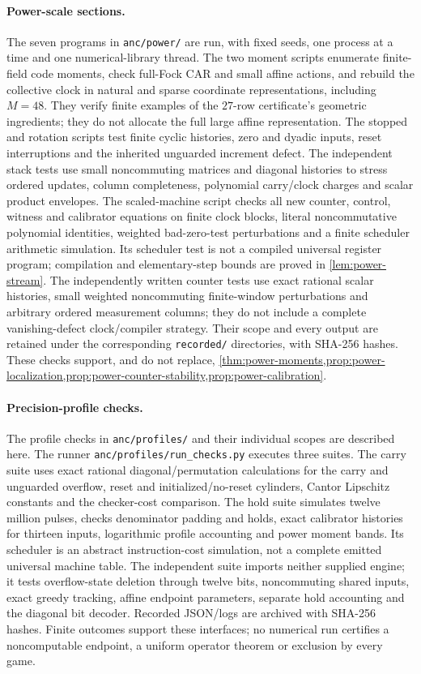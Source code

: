 \paragraph{Power-scale sections.} The seven programs in \texttt{anc/power/} are run, with fixed seeds, one process at a time and one numerical-library thread. The two moment scripts enumerate finite-field code moments, check full-Fock CAR and small affine actions, and rebuild the collective clock in natural and sparse coordinate representations, including $M=48$. They verify finite examples of the $27$-row certificate's geometric ingredients; they do not allocate the full large affine representation. The stopped and rotation scripts test finite cyclic histories, zero and dyadic inputs, reset interruptions and the inherited unguarded increment defect. The independent stack tests use small noncommuting matrices and diagonal histories to stress ordered updates, column completeness, polynomial carry/clock charges and scalar product envelopes. The scaled-machine script checks all new counter, control, witness and calibrator equations on finite clock blocks, literal noncommutative polynomial identities, weighted bad-zero-test perturbations and a finite scheduler arithmetic simulation. Its scheduler test is not a compiled universal register program; compilation and elementary-step bounds are proved in \cref{lem:power-stream}. The independently written counter tests use exact rational scalar histories, small weighted noncommuting finite-window perturbations and arbitrary ordered measurement columns; they do not include a complete vanishing-defect clock/compiler strategy. Their scope and every output are retained under the corresponding \texttt{recorded/} directories, with SHA-256 hashes. These checks support, and do not replace, \cref{thm:power-moments,prop:power-localization,prop:power-counter-stability,prop:power-calibration}.

\paragraph{Precision-profile checks.} The profile checks in \texttt{anc/profiles/} and their individual scopes are described here. The runner \texttt{anc/profiles/run\_checks.py} executes three suites. The carry suite uses exact rational diagonal/permutation calculations for the carry and unguarded overflow, reset and initialized/no-reset cylinders, Cantor Lipschitz constants and the checker-cost comparison. The hold suite simulates twelve million pulses, checks denominator padding and holds, exact calibrator histories for thirteen inputs, logarithmic profile accounting and power moment bands. Its scheduler is an abstract instruction-cost simulation, not a complete emitted universal machine table. The independent suite imports neither supplied engine; it tests overflow-state deletion through twelve bits, noncommuting shared inputs, exact greedy tracking, affine endpoint parameters, separate hold accounting and the diagonal bit decoder. Recorded JSON/logs are archived with SHA-256 hashes. Finite outcomes support these interfaces; no numerical run certifies a noncomputable endpoint, a uniform operator theorem or exclusion by every game.

